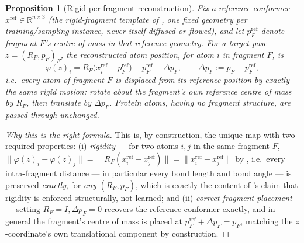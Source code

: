 \documentclass[11pt,a4paper]{report}
\newtheorem{proposition}[proposition]{Proposition}
\theoremstyle{definition}
\theoremstyle{remark}
\newcommand{\RR}{\mathbb R}
\begin{document}
\begin{proposition}[Rigid per-fragment reconstruction]
\label{prop:fragment-reconstruction}
Fix a reference conformer $x^{\mathrm{ref}}\in\RR^{n\times3}$ (the
rigid-fragment template of , one fixed
geometry per training/sampling instance, never itself diffused or flowed),
and let $p_F^{\mathrm{ref}}$ denote fragment $F$'s centre of mass in that
reference geometry. For a target pose $z=(R_F,p_F)_{F}$, the reconstructed
atom position, for atom $i$ in fragment $F$, is
\begin{equation}
\label{eq:fragment-reconstruction-formula}
\varphi(z)_i = R_F\bigl(x_i^{\mathrm{ref}} - p_F^{\mathrm{ref}}\bigr) + p_F^{\mathrm{ref}} + \Delta p_F,
\qquad
\Delta p_F := p_F - p_F^{\mathrm{ref}} ,
\end{equation}
i.e.\ every atom of fragment $F$ is displaced from its reference position
by exactly the same rigid motion: rotate about the fragment's own
reference centre of mass by $R_F$, then translate by $\Delta p_F$. Protein
atoms, having no fragment structure, are passed through unchanged.
\end{proposition}

\begin{proof}[Why this is the right formula]
This is, by construction, the unique map with two required properties: (i)
\emph{rigidity} --- for two atoms $i,j$ in the same fragment $F$,
$\|\varphi(z)_i-\varphi(z)_j\| = \|R_F(x_i^{\mathrm{ref}}-x_j^{\mathrm{ref}})\| = \|x_i^{\mathrm{ref}}-x_j^{\mathrm{ref}}\|$
by , i.e.\ every intra-fragment distance --- in
particular every bond length and bond angle --- is preserved \emph{exactly},
for \emph{any} $(R_F,p_F)$, which is exactly the content of
's claim that rigidity is enforced
structurally, not learned; and (ii) \emph{correct fragment placement} ---
setting $R_F=I,\Delta p_F=0$ recovers the reference conformer exactly, and
in general the fragment's centre of mass is placed at
$p_F^{\mathrm{ref}}+\Delta p_F=p_F$, matching the $z$-coordinate's own
translational component by construction.
\end{proof}
\end{document}
